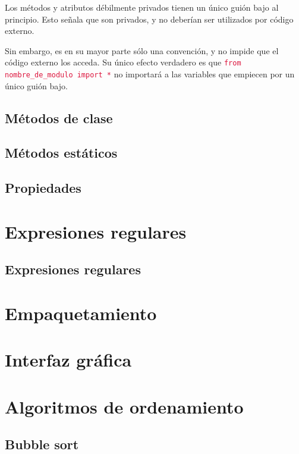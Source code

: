 \documentclass{report}
\newcommand{\ttt}[1]{\textcolor{Crimson}{\texttt{#1}}}
\begin{document}
Los métodos y atributos débilmente privados tienen un único guión bajo al principio. Esto señala que son privados, y no deberían ser utilizados por código externo.\smallskip

Sin embargo, es en su mayor parte sólo una convención, y no impide que el código externo los acceda. Su único efecto verdadero es que \ttt{from nombre\_de\_modulo import *} no importará a las variables que empiecen por un único guión bajo.

\section{Métodos de clase}

\section{Métodos estáticos}

\section{Propiedades}

\clearpage\chapter{Expresiones regulares}

\section{Expresiones regulares}

\clearpage\chapter{Empaquetamiento}

\clearpage\chapter{Interfaz gráfica}

\clearpage\chapter{Algoritmos de ordenamiento}


\section{Bubble sort}
\end{document}

